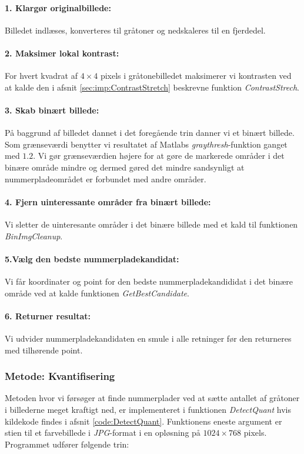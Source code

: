 \paragraph{1. Klargør originalbillede:}
Billedet indlæses, konverteres til gråtoner og nedskaleres til en fjerdedel. 

\paragraph{2. Maksimer lokal kontrast:}
For hvert kvadrat af $4 \times 4$ pixels i gråtonebilledet maksimerer vi kontrasten ved at kalde den i afsnit \vref{sec:imp:ContrastStretch} beskrevne funktion \textit{ContrastStrech}.

\paragraph{3. Skab binært billede:}
På baggrund af billedet dannet i det foregående trin danner vi et binært billede. Som grænseværdi benytter vi resultatet af Matlabs \textit{graythresh}-funktion ganget med $1.2$. Vi gør grænseværdien højere for at gøre de markerede områder i det binære område mindre og dermed gøred det mindre sandsynligt at nummerpladeområdet er forbundet med andre områder.

\paragraph{4. Fjern uinteressante områder fra binært billede:}
Vi sletter de uinteresante områder i det binære billede med et kald til funktionen \textit{BinImgCleanup}.

\paragraph{5.Vælg den bedste nummerpladekandidat:}
Vi får koordinater og point for den bedste nummerpladekandididat i det binære område ved at kalde funktionen \textit{GetBestCandidate}. 

\paragraph{6. Returner resultat:}
Vi udvider nummerpladekandidaten en smule i alle retninger før den returneres med tilhørende point.

\subsubsection{Metode: Kvantifisering}
Metoden hvor vi førsøger at finde nummerplader ved at sætte antallet af gråtoner i billederne meget kraftigt ned, er implementeret i funktionen \textit{DetectQuant} hvis kildekode findes i afsnit \vref{code:DetectQuant}. Funktionens eneste argument er stien til et farvebillede i \textit{JPG}-format i en opløsning på $1024 \times 768$ pixels. Programmet udfører følgende trin:

